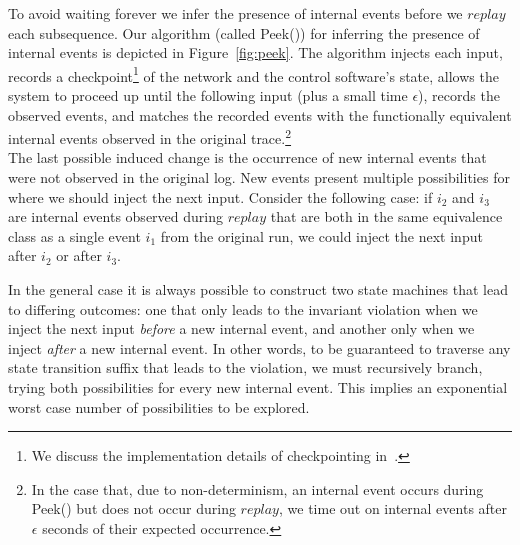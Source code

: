 To avoid waiting forever we infer the presence of internal
events before we $replay$ each subsequence. Our algorithm (called {\sc Peek()}) for inferring the
presence of internal events is depicted in
Figure~\ref{fig:peek}. The algorithm injects each input, records a checkpoint\footnote{We discuss the implementation details of checkpointing
in~\cite{sts2014}.} of
the network and the control software's state, allows the system to proceed up
until the following input (plus a small time $\epsilon$), records the observed
events, and matches the
recorded events with the functionally equivalent internal events observed in
the original trace.\footnote{In the
case that, due
to non-determinism, an internal event occurs during {\sc Peek()} but does not occur
during $replay$, we time out on internal events after $\epsilon$ seconds of
their expected occurrence.}\\[0.5ex]
%
%
 The last possible induced change is the occurrence of new
internal events that were not observed in the original log.
New events present multiple possibilities for where
we should inject the next input. Consider the following case:
if $i_2$ and $i_3$ are internal events observed
during $replay$ that are both in the same equivalence class as a single event $i_1$ from the
original run, we could inject the next input after $i_2$ or after $i_3$.


In the general case it is always possible to construct two state machines that lead
to differing outcomes: one that only leads to the invariant violation when
we inject the next input
\emph{before} a new internal event, and another only when we inject \emph{after} a new internal
event. In other words, to be guaranteed to traverse any state transition suffix that leads
to the violation, we must recursively branch, trying both
possibilities for every new internal event. This implies an exponential worst
case number of
possibilities to be explored.

